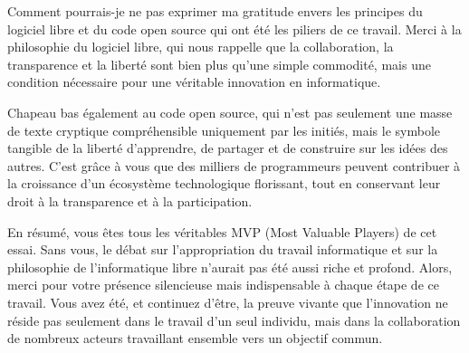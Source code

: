 \documentclass[10pt]{book}
\begin{document}
Comment pourrais-je ne pas exprimer ma gratitude envers les principes du logiciel libre et du code open source qui ont été les piliers de ce travail. Merci à la philosophie du logiciel libre, qui nous rappelle que la collaboration, la transparence et la liberté sont bien plus qu'une simple commodité, mais une condition nécessaire pour une véritable innovation en informatique.

Chapeau bas également au code open source, qui n'est pas seulement une masse de texte cryptique compréhensible uniquement par les initiés, mais le symbole tangible de la liberté d'apprendre, de partager et de construire sur les idées des autres. C'est grâce à vous que des milliers de programmeurs peuvent contribuer à la croissance d'un écosystème technologique florissant, tout en conservant leur droit à la transparence et à la participation.

En résumé, vous êtes tous les véritables MVP (Most Valuable Players) de cet essai. Sans vous, le débat sur l'appropriation du travail informatique et sur la philosophie de l'informatique libre n'aurait pas été aussi riche et profond. Alors, merci pour votre présence silencieuse mais indispensable à chaque étape de ce travail. Vous avez été, et continuez d'être, la preuve vivante que l'innovation ne réside pas seulement dans le travail d'un seul individu, mais dans la collaboration de nombreux acteurs travaillant ensemble vers un objectif commun.


\end{document}
